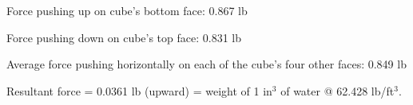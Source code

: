 
Force pushing up on cube's bottom face: 0.867 lb

Force pushing down on cube's top face: 0.831 lb

Average force pushing horizontally on each of the cube's four other faces: 0.849 lb

\vskip 10pt

Resultant force = 0.0361 lb (upward) = weight of 1 in$^{3}$ of water @ 62.428 lb/ft$^{3}$.











